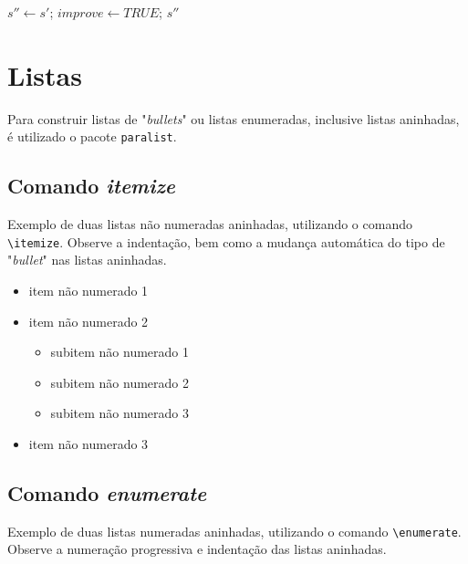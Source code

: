 \begin{algorithm}[ht]
    $s'' \leftarrow s'$;
    $improve \leftarrow TRUE$;
    \KwRetorna $s''$\;
    \caption{Local search procedure}
    \label{alg:busca_local}
\end{algorithm}

\section{Listas}
\label{sec:lista}

Para construir listas de "\textit{bullets}"{} ou listas enumeradas, inclusive listas aninhadas, é utilizado o pacote \verb|paralist|.

\subsection{Comando \textit{itemize}}
Exemplo de duas listas não numeradas aninhadas, utilizando o comando \verb|\itemize|. Observe a indentação, bem como a mudança automática do tipo de "\textit{bullet}"{} nas listas aninhadas.

\begin{itemize}
    \item item não numerado 1
    \item item não numerado 2
    \begin{itemize}
        \item subitem não numerado 1
        \item subitem não numerado 2
        \item subitem não numerado 3
    \end{itemize}
    \item item não numerado 3
\end{itemize}

\subsection{Comando \textit{enumerate}}
Exemplo de duas listas numeradas aninhadas, utilizando o comando \verb|\enumerate|. Observe a numeração progressiva e indentação das listas aninhadas.

